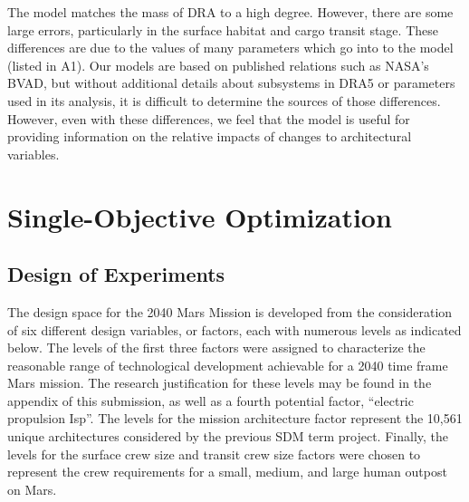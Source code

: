 \documentclass[]{aiaa-pretty}
\begin{document}
The model matches the mass of DRA to a high degree. However, there are some large errors, particularly in the surface habitat and cargo transit stage. These differences are due to the values of many parameters which go into to the model (listed in A1). Our models are based on published relations such as NASA's BVAD, but without additional details about subsystems in DRA5 or parameters used in its analysis, it is difficult to determine the sources of those differences. However, even with these differences, we feel that the model is useful for providing information on the relative impacts of changes to architectural variables. 
\section{Single-Objective Optimization}
\label{sec:single}
\subsection{Design of Experiments}
\label{sec:DOE}
The design space for the 2040 Mars Mission is developed from the consideration of six different design variables, or factors, each with numerous levels as indicated below. The levels of the first three factors were assigned to characterize the reasonable range of technological development achievable for a 2040 time frame Mars mission. The research justification for these levels may be found in the appendix of this submission, as well as a fourth potential factor, “electric propulsion Isp”. The levels for the mission architecture factor represent the 10,561 unique architectures considered by the previous SDM term project. Finally, the levels for the surface crew size and transit crew size factors were chosen to represent the crew requirements for a small, medium, and large human outpost on Mars.
\end{document}
